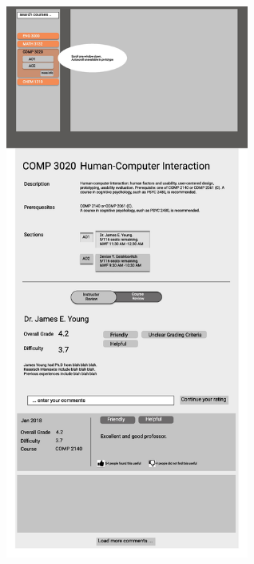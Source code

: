 \documentclass{article}
\begin{document}
\begin{figure}[h]
        \includegraphics[width=8cm]{ViewCourseInfo_Prototype/Course_Instructor6.jpg}

    \end{figure}
\end{document}
